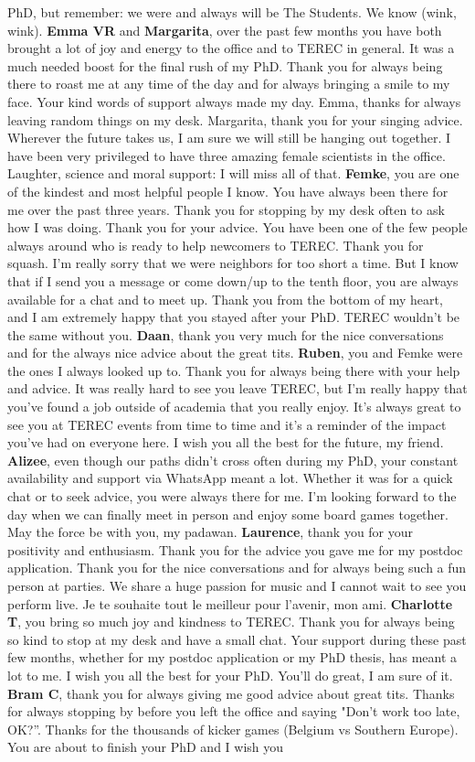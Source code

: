 \documentclass[10pt, twoside]{book} %
\begin{document}
PhD, but remember: we were and always will be The Students. We know (wink, wink). \textbf{Emma VR} and \textbf{Margarita}, over the past few months you have both brought a lot of joy and energy to the office and to TEREC in general. It was a much needed boost for the final rush of my PhD. Thank you for always being there to roast me at any time of the day and for always bringing a smile to my face. Your kind words of support always made my day. Emma, thanks for always leaving random things on my desk. Margarita, thank you for your singing advice. Wherever the future takes us, I am sure we will still be hanging out together. I have been very privileged to have three amazing female scientists in the office. Laughter, science and moral support: I will miss all of that. \textbf{Femke}, you are one of the kindest and most helpful people I know. You have always been there for me over the past three years. Thank you for stopping by my desk often to ask how I was doing. Thank you for your advice. You have been one of the few people always around who is ready to help newcomers to TEREC. Thank you for squash. I'm really sorry that we were neighbors for too short a time. But I know that if I send you a message or come down/up to the tenth floor, you are always available for a chat and to meet up. Thank you from the bottom of my heart, and I am extremely happy that you stayed after your PhD. TEREC wouldn't be the same without you. \textbf{Daan}, thank you very much for the nice conversations and for the always nice advice about the great tits. \textbf{Ruben}, you and Femke were the ones I always looked up to. Thank you for always being there with your help and advice. It was really hard to see you leave TEREC, but I'm really happy that you've found a job outside of academia that you really enjoy. It's always great to see you at TEREC events from time to time and it's a reminder of the impact you've had on everyone here. I wish you all the best for the future, my friend. \textbf{Alizee}, even though our paths didn't cross often during my PhD, your constant availability and support via WhatsApp meant a lot. Whether it was for a quick chat or to seek advice, you were always there for me. I'm looking forward to the day when we can finally meet in person and enjoy some board games together. May the force be with you, my padawan. \textbf{Laurence}, thank you for your positivity and enthusiasm. Thank you for the advice you gave me for my postdoc application. Thank you for the nice conversations and for always being such a fun person at parties. We share a huge passion for music and I cannot wait to see you perform live. Je te souhaite tout le meilleur pour l'avenir, mon ami. \textbf{Charlotte T}, you bring so much joy and kindness to TEREC. Thank you for always being so kind to stop at my desk and have a small chat. Your support during these past few months, whether for my postdoc application or my PhD thesis, has meant a lot to me. I wish you all the best for your PhD. You'll do great, I am sure of it. \textbf{Bram C}, thank you for always giving me good advice about great tits. Thanks for always stopping by before you left the office and saying "Don't work too late, OK?”. Thanks for the thousands of kicker games (Belgium vs Southern Europe). You are about to finish your PhD and I wish you 
\end{document}
